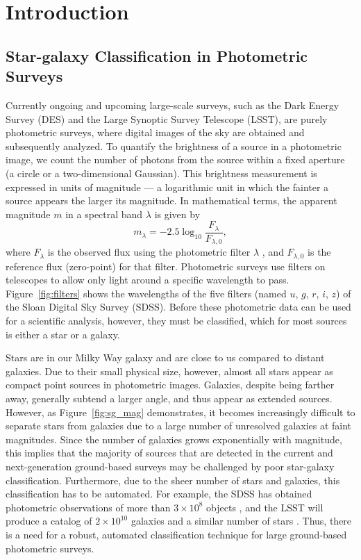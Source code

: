 \chapter{Introduction}


\section{Star-galaxy Classification in Photometric Surveys}


Currently ongoing and upcoming large-scale surveys, such as the Dark Energy Survey (DES)
and the Large Synoptic Survey Telescope (LSST), are purely photometric surveys,
where digital images of the sky are obtained and subsequently analyzed.
To quantify the brightness of a source in a photometric image,
we count the number of photons from the source within a fixed aperture
(\eg a circle or a two-dimensional Gaussian).
This brightness measurement is expressed in units of magnitude ---
a logarithmic unit in which the fainter a source appears the larger its magnitude.
In mathematical terms, the apparent magnitude $m$ in a spectral band $\lambda$ is given by
\begin{equation}
m_{\lambda} = - 2.5 \log_{10} \frac{ F_{\lambda} }{ F_{\lambda,0} },
\end{equation}
where $F_{\lambda}$ is the observed flux using the photometric filter $\lambda$ ,
and $F_{\lambda,0}$ is the reference flux (\ie zero-point) for that filter.
Photometric surveys use filters on telescopes to allow only light around
a specific wavelength to pass.
Figure~\ref{fig:filters} shows the wavelengths of the five filters (named $u$, $g$, $r$, $i$, $z$)
of the Sloan Digital Sky Survey (SDSS).
Before these photometric data can be used for a scientific analysis, however, they must be classified,
which for most sources is either a star or a galaxy.

Stars are in our Milky Way galaxy and are close to us compared to distant galaxies.
Due to their small physical size, however, almost all stars appear as compact point sources
in photometric images.
Galaxies, despite being farther away, generally subtend a larger angle, and thus
appear as extended sources.
However, as Figure~\ref{fig:sg_mag} demonstrates, it becomes increasingly difficult
to separate stars from galaxies due to a large number of unresolved galaxies at faint magnitudes.
Since the number of galaxies grows exponentially with magnitude, 
this implies that the majority of sources that are detected in the current and
next-generation ground-based surveys may be challenged by poor star-galaxy classification.
Furthermore, due to the sheer number of stars and galaxies,
this classification has to be automated.
For example, the SDSS has obtained photometric observations of more than $3 \times 10^8$ objects
\citep{eisenstein2011sdss},
and the LSST will produce a catalog of $2 \times 10^{10}$ galaxies and a similar number of stars
\citep{ivezic2008lsst}.
Thus, there is a need for a robust, automated classification technique for large ground-based photometric surveys.

